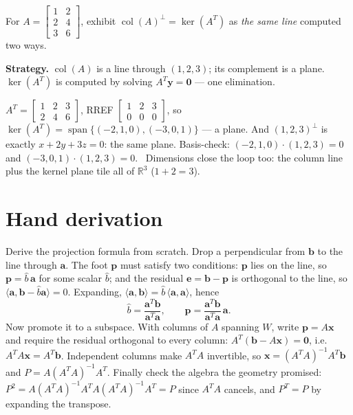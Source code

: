 \begin{example}\label{ex:pairing}
For $A=\begin{bmatrix}1&2\\2&4\\3&6\end{bmatrix}$, exhibit
$\operatorname{col}(A)^{\perp}=\ker(A^{T})$ as \emph{the same line}
computed two ways.
\par\smallskip
\textbf{Strategy.} $\operatorname{col}(A)$ is a line through
$(1,2,3)$; its complement is a plane. $\ker(A^{T})$ is computed by
solving $A^{T}\mathbf y=\mathbf0$ --- one elimination.
\begin{solution}
$A^{T}=\begin{bmatrix}1&2&3\\2&4&6\end{bmatrix}$, RREF
$\begin{bmatrix}1&2&3\\0&0&0\end{bmatrix}$, so $\ker(A^{T})=
\operatorname{span}\{(-2,1,0),(-3,0,1)\}$ --- a plane. And
$(1,2,3)^{\perp}$ is exactly $x+2y+3z=0$: the same plane.
Basis-check: $(-2,1,0)\cdot(1,2,3)=0$ and
$(-3,0,1)\cdot(1,2,3)=0$. \checkmark\ Dimensions close the loop
too: the column line plus the kernel plane tile all of
$\mathbb{R}^{3}$ ($1+2=3$).
\end{solution}
\end{example}

\section{Hand derivation}\label{sec:handderiv5}

Derive the projection formula from scratch. Drop a perpendicular from
$\mathbf b$ to the line through $\mathbf a$. The foot $\mathbf p$ must satisfy
two conditions: $\mathbf p$ lies on the line, so $\mathbf p=\hat b\,\mathbf a$
for some scalar $\hat b$; and the residual $\mathbf e=\mathbf b-\mathbf p$ is
orthogonal to the line, so $\langle\mathbf a,\mathbf b-\hat b\mathbf a\rangle=0$.
Expanding,
$\langle\mathbf a,\mathbf b\rangle=\hat b\,\langle\mathbf a,\mathbf a\rangle$,
hence
\[
\hat b=\frac{\mathbf a^{T}\mathbf b}{\mathbf a^{T}\mathbf a},\qquad
\mathbf p=\frac{\mathbf a^{T}\mathbf b}{\mathbf a^{T}\mathbf a}\,\mathbf a .
\]
Now promote it to a subspace. With columns of $A$ spanning $W$, write
$\mathbf p=A\mathbf x$ and require the residual orthogonal to every column:
$A^{T}(\mathbf b-A\mathbf x)=\mathbf0$, i.e.\ $A^{T}A\mathbf x=A^{T}\mathbf b$.
Independent columns make $A^{T}A$ invertible, so
$\mathbf x=(A^{T}A)^{-1}A^{T}\mathbf b$ and
$P=A(A^{T}A)^{-1}A^{T}$. Finally check the algebra the geometry
promised: $P^2=A(A^{T}A)^{-1}A^{T}A(A^{T}A)^{-1}A^{T}=P$ since
$A^{T}A$ cancels, and $P^{T}=P$ by expanding the transpose.

